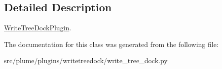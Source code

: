 \subsection{Detailed Description}
\hyperlink{classplume-creator_1_1src_1_1plume_1_1plugins_1_1writetreedock_1_1write__tree__dock_1_1_write_tree_dock_plugin}{Write\+Tree\+Dock\+Plugin}. 

The documentation for this class was generated from the following file\+:\begin{DoxyCompactItemize}
\item 
src/plume/plugins/writetreedock/write\+\_\+tree\+\_\+dock.\+py\end{DoxyCompactItemize}
